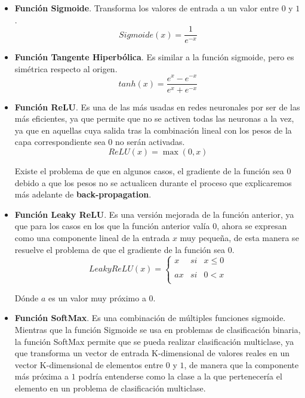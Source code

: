         \begin{itemize}
            \item \textbf{Función Sigmoide}. Transforma los valores de entrada a un valor entre $0$ y $1$.
            \begin{equation}
                Sigmoide(x)=\frac{1}{e^{-x}}
            \end{equation}
            \item \textbf{Función Tangente Hiperbólica}. Es similar a la función sigmoide, pero es simétrica respecto al origen. 
            \begin{equation}
                tanh(x)=\frac{e^x - e^{-x}}{e^x + e^{-x}} 
            \end{equation}
            \item \textbf{Función ReLU}. Es una de las más usadas en redes neuronales por ser de las más eficientes, ya que permite que no se activen todas las neuronas a la vez, ya que en aquellas cuya salida tras la combinación lineal con los pesos de la capa correspondiente sea 0 no serán activadas.
            \begin{equation}
                ReLU(x)=\max(0,x)
            \end{equation}

            \noindent Existe el problema de que en algunos casos, el gradiente de la función sea $0$ debido a que los pesos no se actualicen durante el proceso que explicaremos más adelante de \textbf{back-propagation}.

            \item \textbf{Función Leaky ReLU}. Es una versión mejorada de la función anterior, ya que para los casos en los que la función anterior valía $0$, ahora se expresan como una componente lineal de la entrada $x$ muy pequeña, de esta manera se resuelve el problema de que el gradiente de la función sea $0$. 
            \begin{equation}
                LeakyReLU(x)=\left\{ \begin{array}{lcc}
                    x &   si  & x \leq 0 \\
                    \\ ax &  si & 0 < x \\
                    \end{array}
                \right.
            \end{equation}

            \noindent Dónde $a$ es un valor muy próximo a $0$.
            \item \textbf{Función SoftMax}. Es una combinación de múltiples funciones sigmoide. Mientras que la función Sigmoide se usa en problemas de clasificación binaria, la función SoftMax permite que se pueda realizar clasificación multiclase, ya que transforma un vector de entrada K-dimensional de valores reales en un vector K-dimensional de elementos entre $0$ y $1$, de manera que la componente más próxima a $1$ podría entenderse como la clase a la que pertenecería el elemento en un problema de clasificación multiclase.
            

\end{itemize}
